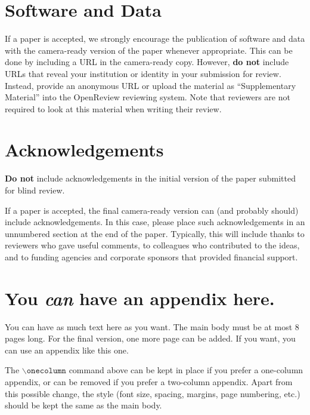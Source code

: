 \documentclass{article}
\theoremstyle{plain}
\theoremstyle{definition}
\theoremstyle{remark}
\begin{document}
\section*{Software and Data}

If a paper is accepted, we strongly encourage the publication of software and data with the
camera-ready version of the paper whenever appropriate. This can be
done by including a URL in the camera-ready copy. However, \textbf{do not}
include URLs that reveal your institution or identity in your
submission for review. Instead, provide an anonymous URL or upload
the material as ``Supplementary Material'' into the OpenReview reviewing
system. Note that reviewers are not required to look at this material
when writing their review.

\section*{Acknowledgements}

\textbf{Do not} include acknowledgements in the initial version of
the paper submitted for blind review.

If a paper is accepted, the final camera-ready version can (and
probably should) include acknowledgements. In this case, please
place such acknowledgements in an unnumbered section at the
end of the paper. Typically, this will include thanks to reviewers
who gave useful comments, to colleagues who contributed to the ideas,
and to funding agencies and corporate sponsors that provided financial
support.


\nocite{langley00}





\newpage
\appendix
\onecolumn
\section{You \emph{can} have an appendix here.}

You can have as much text here as you want. The main body must be at most $8$ pages long.
For the final version, one more page can be added.
If you want, you can use an appendix like this one.  

The $\mathtt{\backslash onecolumn}$ command above can be kept in place if you prefer a one-column appendix, or can be removed if you prefer a two-column appendix.  Apart from this possible change, the style (font size, spacing, margins, page numbering, etc.) should be kept the same as the main body.
\end{document}
